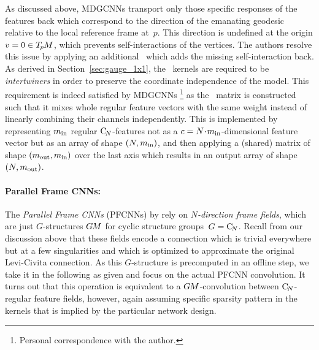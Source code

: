 As discussed above, MDGCNNs transport only those specific responses of the features back which correspond to the direction of the emanating geodesic relative to the local reference frame at~$p$.
This direction is undefined at the origin $v=0 \in T_{\mkern-1.5mu p}\mkern-.5muM$, which prevents self-interactions of the vertices.
The authors resolve this issue by applying an additional \onexone\ which adds the missing self-interaction back.
As derived in Section~\ref{sec:gauge_1x1}, the \onexone\ kernels are required to be \emph{intertwiners} in order to preserve the coordinate independence of the model.
This requirement is indeed satisfied by MDGCNNs%
\footnote{
    Personal correspondence with the author.
}
as the \onexone\ matrix is constructed such that it mixes whole regular feature vectors with the same weight instead of linearly combining their channels independently.
This is implemented by representing $m_\textup{in}$ regular $\operatorname{C}_{\!N}$-features not as a ${c=N \!\cdot\! m_\textup{in}}$-dimensional feature vector but as an array of shape $(N,m_\textup{in})$, and then applying a (shared) matrix of shape $(m_\textup{out},m_\textup{in})$ over the last axis which results in an output array of shape $(N,m_\textup{out})$.








\paragraph{Parallel Frame CNNs:}
The \emph{Parallel Frame CNNs} (PFCNNs) by \citet{Yang2020parallelFrameCNN} rely on \emph{$N$-direction frame fields}, which are just $G$-structures $G\mkern-1.4muM$ for cyclic structure groups~$G=\operatorname{C}_{\!N}$.
Recall from our discussion above that these fields encode a connection which is trivial everywhere but at a few singularities and which is optimized to approximate the original Levi-Civita connection.
As this $G$-structure is precomputed in an offline step, we take it in the following as given and focus on the actual PFCNN convolution.
It turns out that this operation is equivalent to a $G\mkern-1.4muM$-convolution between $\operatorname{C}_{\!N}$-regular feature fields, however, again assuming specific sparsity pattern in the kernels that is implied by the particular network design.

